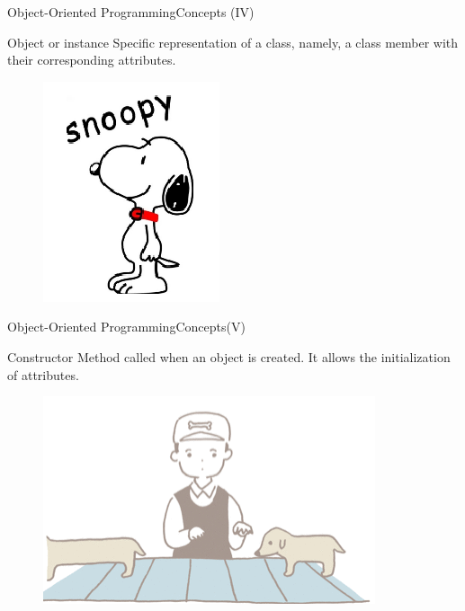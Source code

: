 \documentclass[10pt,compress]{beamer} %
\begin{document}
\begin{frame}{Object-Oriented Programming}{Concepts (IV)}
	\vfill\begin{block}{Object or instance}
		 Specific representation of a class, namely, a class member with their corresponding attributes.
  	\end{block}	  	
		\begin{figure}
			\includegraphics[scale=0.5]{figs/instancia}
		\end{figure}				
\end{frame}

\begin{frame}{Object-Oriented Programming}{Concepts(V)}
	\begin{block}{Constructor}
		 Method called when an object is created. It allows the initialization of attributes. 
  	\end{block}	
		\begin{figure}
			\includegraphics[scale=0.5]{figs/constructor}
		\end{figure}				
\end{frame}
\end{document}
